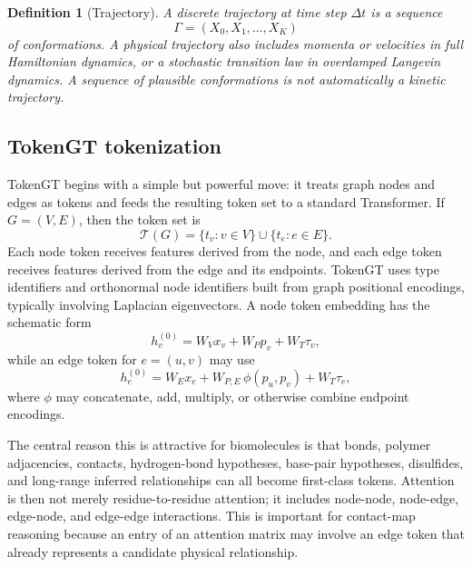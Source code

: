 \documentclass[11pt]{article}
\newtheorem{definition}{Definition}
\newcommand{\T}{\mathcal{T}}
\begin{document}
\begin{definition}[Trajectory]
A discrete trajectory at time step $\Delta t$ is a sequence
\[
\Gamma = (X_0,X_1,\dots,X_K)
\]
of conformations. A physical trajectory also includes momenta or velocities in full Hamiltonian dynamics, or a stochastic transition law in overdamped Langevin dynamics. A sequence of plausible conformations is not automatically a kinetic trajectory.
\end{definition}

\subsection{TokenGT tokenization}

TokenGT begins with a simple but powerful move: it treats graph nodes and edges as tokens and feeds the resulting token set to a standard Transformer. If $G=(V,E)$, then the token set is
\[
\T(G)=\{t_v:v\in V\}\cup\{t_e:e\in E\}.
\]
Each node token receives features derived from the node, and each edge token receives features derived from the edge and its endpoints. TokenGT uses type identifiers and orthonormal node identifiers built from graph positional encodings, typically involving Laplacian eigenvectors. A node token embedding has the schematic form
\[
h_v^{(0)} = W_V x_v + W_P p_v + W_T \tau_v,
\]
while an edge token for $e=(u,v)$ may use
\[
h_e^{(0)} = W_E x_e + W_{P,E}\,\phi(p_u,p_v) + W_T\tau_e,
\]
where $\phi$ may concatenate, add, multiply, or otherwise combine endpoint encodings.

The central reason this is attractive for biomolecules is that bonds, polymer adjacencies, contacts, hydrogen-bond hypotheses, base-pair hypotheses, disulfides, and long-range inferred relationships can all become first-class tokens. Attention is then not merely residue-to-residue attention; it includes node-node, node-edge, edge-node, and edge-edge interactions. This is important for contact-map reasoning because an entry of an attention matrix may involve an edge token that already represents a candidate physical relationship.
\end{document}
